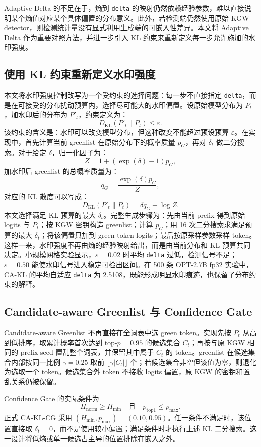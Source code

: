 \documentclass[a4paper,UTF8,zihao=5]{ctexart}
\newcommand{\method}{CA-KL}
\begin{document}
Adaptive Delta 的不足在于，熵到 \texttt{delta} 的映射仍然依赖经验参数，难以直接说明某个熵值对应某个具体偏置的分布意义。此外，若检测端仍然使用原始 KGW detector，则检测统计量没有显式利用生成端的可嵌入性差异。本文将 Adaptive Delta 作为重要对照方法，并进一步引入 KL 约束来重新定义每一步允许施加的水印强度。

\subsection{使用 KL 约束重新定义水印强度}

本文将水印强度控制改写为一个受约束的选择问题：每一步不直接指定 \texttt{delta}，而是在可接受的分布扰动预算内，选择尽可能大的水印偏置。设原始模型分布为 $P_t$，加水印后的分布为 $P'_t$，约束定义为：
\[
    D_{\mathrm{KL}}(P'_t\|P_t)\leq \varepsilon.
\]
该约束的含义是：水印可以改变模型分布，但这种改变不能超过预设预算 $\varepsilon$。在实现中，首先计算当前 greenlist 在原始分布下的概率质量 $p_G$，再对 $\delta_t$ 做二分搜索。对于给定 $\delta$，归一化因子为：
\[
    Z=1+(\exp(\delta)-1)p_G,
\]
加水印后 greenlist 的总概率质量为：
\[
    q_G=\frac{\exp(\delta)p_G}{Z},
\]
对应的 KL 散度可以写成：
\[
    D_{\mathrm{KL}}(P'_t\|P_t)=\delta q_G-\log Z.
\]
本文选择满足 KL 预算的最大 $\delta_t$。完整生成步骤为：先由当前 prefix 得到原始 logits 与 $P_t$；按 KGW 密钥构造 greenlist；计算 $p_G$；用 16 次二分搜索求满足预算的最大 $\delta_t$；将该偏置只加到 green token logits；最后按原采样参数采样 token。这样一来，水印强度不再由熵的经验映射给出，而是由当前分布和 KL 预算共同决定。小规模网格实验显示，$\varepsilon=0.02$ 时平均 \texttt{delta} 过低，检测信号不足；$\varepsilon=0.50$ 能使水印信号进入稳定可检出区间。在 500 条 OPT-2.7B fp32 实验中，\method{} 的平均自适应 \texttt{delta} 为 2.5108，既能形成明显水印痕迹，也保留了分布约束的解释。

\subsection{Candidate-aware Greenlist 与 Confidence Gate}

Candidate-aware Greenlist 不再直接在全词表中选 green token。实现先按 $P_t$ 从高到低排序，取累计概率首次达到 top-$p=0.95$ 的候选集合 $C_t$；再按与原 KGW 相同的 prefix seed 置乱整个词表，并保留其中属于 $C_t$ 的 token。greenlist 在候选集合内部按同一比例 $\gamma=0.25$ 取前 $\lfloor\gamma |C_t|\rfloor$ 个；若候选集合非空但该值为零，则退化为选取一个 token。候选集合外 token 不接收 logits 偏置，原 KGW 的密钥和置乱关系仍被保留。

Confidence Gate 的实际条件为
\[
H_{\mathrm{norm}}\ge H_{\min}\quad\text{且}\quad p_{\mathrm{top1}}\le p_{\max}.
\]
正式 CA-KL-CG 采用 $(H_{\min},p_{\max})=(0.10,0.95)$。任一条件不满足时，该位置直接取 $\delta_t=0$，而不是使用较小偏置；满足条件时才执行上述 KL 二分搜索。这一设计将低熵或单一候选占主导的位置排除在嵌入之外。
\end{document}
